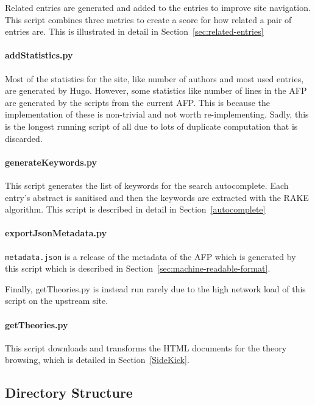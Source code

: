 \documentclass[bsc,frontabs,oneside,singlespacing,parskip,deptreport,logo]{infthesis}
\begin{document}
Related entries are generated and added to the entries to improve site navigation. This script combines three metrics to create a score for how related a pair of entries are. This is illustrated in detail in Section~\ref{sec:related-entries}

\paragraph*{addStatistics.py}

Most of the statistics for the site, like number of authors and most used entries, are generated by Hugo. However, some statistics like number of lines in the AFP are generated by the scripts from the current AFP\@. This is because the implementation of these is non-trivial and not worth re-implementing. Sadly, this is the longest running script of all due to lots of duplicate computation that is discarded.

\paragraph*{generateKeywords.py}

This script generates the list of keywords for the search autocomplete. Each entry's abstract is sanitised and then the keywords are extracted with the RAKE algorithm. This script is described in detail in Section~\ref{autocomplete}

\paragraph*{exportJsonMetadata.py}

\texttt{metadata.json} is a release of the metadata of the AFP which is generated by this script which is described in Section~\ref{sec:machine-readable-format}.

\bigskip
Finally, getTheories.py is instead run rarely due to the high network load of this script on the upstream site.

\paragraph*{getTheories.py}

This script downloads and transforms the HTML documents for the theory browsing, which is detailed in Section~\ref{SideKick}. 

\subsection{Directory Structure}
\end{document}
